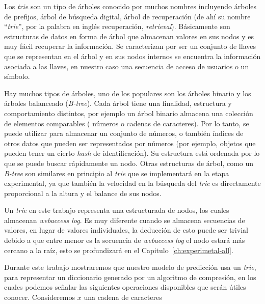 
Los \emph{trie} son un tipo de árboles conocido por muchos nombres incluyendo árboles de prefijos, árbol de búsqueda digital, árbol de recuperación (de ahí su nombre ``\emph{trie}'', por la palabra en inglés recuperación, \emph{retrieval}). Básicamente son estructuras de datos en forma de árbol que almacenan valores en sus nodos y es muy fácil recuperar la información. Se caracterizan por ser un conjunto de llaves que se representan en el árbol y en sus nodos internos se encuentra la información asociada a las llaves, en nuestro caso una secuencia de acceso de usuarios o un símbolo. 

Hay muchos tipos de árboles, uno de los populares son los árboles binario y los árboles balanceado (\emph{B-tree}). Cada árbol tiene una finalidad, estructura y comportamiento distintos, por ejemplo un árbol binario almacena una colección de elementos comparables ( números o cadenas de caracteres). Por lo tanto, se puede utilizar para almacenar un conjunto de números, o también  índices de otros datos que pueden ser representados por números (por ejemplo, objetos que pueden tener un cierto \emph{hash} de identificación). Su estructura está ordenada por lo que se puede buscar rápidamente un nodo. Otras estructuras de árbol, como un \emph{B-tree} son similares en principio al \emph{trie} que se implementará en la etapa experimental, ya que también la velocidad en la búsqueda del \emph{trie} es directamente proporcional a la altura y el balance de sus nodos.

Un \emph{trie} en este trabajo representa una estructurada de nodos, los cuales almacenan \emph{webaccess log}.  Es muy diferente cuando se almacena secuencias de valores, en lugar de valores individuales, la deducción de esto puede ser trivial debido a que entre menor es la secuencia de \emph{webaccess log} el nodo estará más cercano a la raíz, esto se profundizará en el Capitulo~\ref{ch:experimetal-all}. %


Durante este trabajo mostraremos que nuestro modelo de predicción usa un \emph{trie}, para representar un diccionario generado por un algoritmo de compresión, en los cuales podemos señalar las siguientes operaciones disponibles que serán útiles conocer. Consideremos $x$ una cadena de caracteres

